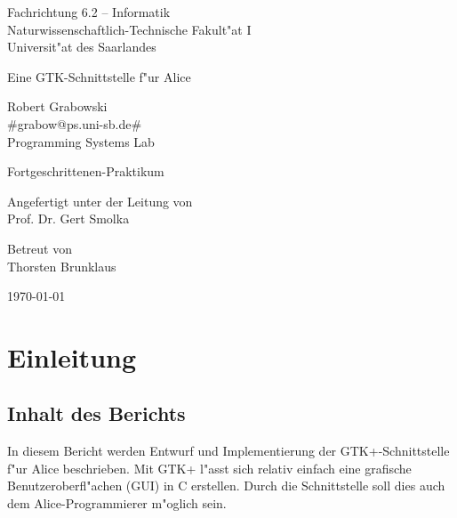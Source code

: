 \documentclass[a4paper,titlepage]{article}
\begin{document}
\begin{titlepage}
  \begin{small}\noindent Fachrichtung 6.2 -- Informatik\\
  Naturwissenschaftlich-Technische Fakult"at I\\
  Universit"at des Saarlandes\\
  \end{small}
  \vspace{2cm}

  \begin{center}

    {\LARGE Eine GTK-Schnittstelle f"ur Alice}
    \vspace{1cm}

    Robert Grabowski\\
    #grabow@ps.uni-sb.de#\\
    Programming Systems Lab

    \vspace{2cm}
    {\Large Fortgeschrittenen-Praktikum}

    \vspace{1cm}
    Angefertigt unter der Leitung von\\
    Prof. Dr. Gert Smolka

    \vspace{1cm}
    Betreut von\\
    Thorsten Brunklaus
    
    \vspace{4cm}
    \today

  \end{center}

\end{titlepage}

\tableofcontents

\section{Einleitung}

\subsection{Inhalt des Berichts}

In diesem Bericht werden Entwurf und Implementierung der 
GTK+-Schnittstelle f"ur Alice beschrieben. Mit GTK+ l"asst sich relativ einfach
eine grafische Benutzeroberfl"achen (GUI) in C erstellen. 
Durch die Schnittstelle soll
dies auch dem Alice-Programmierer m"oglich sein.
\end{document}
